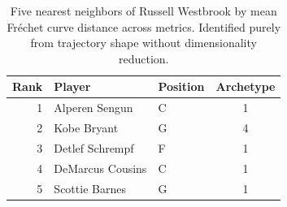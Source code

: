 \begin{table}[htbp]
  \centering\small
  \begin{tabular}{rllc}
    \toprule
    Rank & Player & Position & Archetype \\
    \midrule
    1 & Alperen Sengun & C & 1 \\
    2 & Kobe Bryant & G & 4 \\
    3 & Detlef Schrempf & F & 1 \\
    4 & DeMarcus Cousins & C & 1 \\
    5 & Scottie Barnes & G & 1 \\
    \bottomrule
  \end{tabular}
  \caption{Five nearest neighbors of Russell Westbrook by mean Fr\'{e}chet curve distance across metrics. Identified purely from trajectory shape without dimensionality reduction.}
  \label{tab:Russell_Westbrook_frechet_curve_neighbors}
\end{table}

